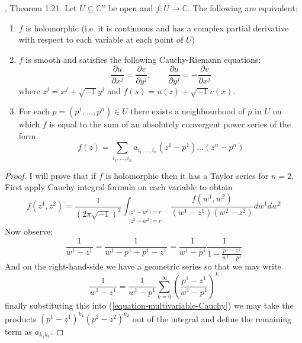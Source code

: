 \begin{lemma}
\label{lemma-holomorphic-function-characterization}
\cite{lec}, Theorem 1.21. Let $U\subseteq\mathbb{C}^n$ be open and $f:U\to
\mathbb{C}$. The following are equivalent:
\begin{enumerate}
\item $f$ is holomorphic (i.e. it is continuous and has a complex partial
derivative with respect to each variable at each point of $U$)
\item $f$ is smooth and satisfies the following Cauchy-Riemann equations:
\begin{equation}
\label{equation-Cauchy-Riemann-several-variables}
\frac{\partial u}{\partial x^j}=\frac{\partial v}{\partial y^j},\qquad 
\frac{\partial u}{\partial y^j}=-\frac{\partial v}{\partial x^j}
\end{equation}
where $z^j=x^j+\sqrt{-1}y^j$ and $f(s)=u(z)+\sqrt{-1}v(x)$.
\item For each $p=(p^1,\ldots,p^n)\in U$ there exists a neighbourhood of $p$ in
$U$ on which $f$ is equal to the sum of an absolutely convergent power series of
the form
\begin{equation}
\label{equation-Taylor-series-several-variables}
f(z)=\sum_{i_1,\ldots,i_n}a_{i_1,\ldots,i_n}(z^1-p^1)\ldots(z^n-p^n)
\end{equation}
\end{enumerate}
\end{lemma}

\begin{proof}
I will prove that if $f$ is holomorphic then it has a Taylor series for $n=2$. 
First apply Cauchy integral formula on each variable to obtain
$$
f(z^1,z^2)=\frac{1}{(2\pi\sqrt{-1})^2}
\int_{\substack{|z^1-w^1|=r \\ |z^2-w^2|=r}}
\frac{f(w^1,w^2)}{(w^1-z^1)(w^2-z^2)}dw^1dw^2
$$
Now observe:
\begin{equation}
\label{equation-multivariable-Cauchy}
\frac{1}{w^1-z^1}=\frac{1}{w^1-p^1+p^1-z^1}
=\frac{1}{w^1-p^1}\frac{1}{1-\frac{p^1-z^1}{w^1-p^1}}
\end{equation}
And on the right-hand-side we have a geometric series so that we may write
$$
\frac{1}{w^1-z^1}
=\frac{1}{w^1-p^1}\sum_{k=0}^\infty\left(\frac{p^1-z^1}{w^1-p^1}\right)^k
$$
finally substituting this into (\ref{equation-multivariable-Cauchy}) we may take
the products $(p^1-z^1)^{k_1}(p^2-z^2)^{k_2}$ out of the integral and define the
remaining term as $a_{k_1k_2}$.
\end{proof}

